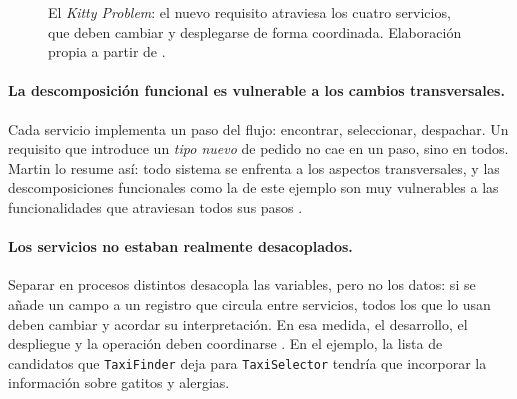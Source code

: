 \begin{figure}[htbp]
  \centering
  \caption{El \emph{Kitty Problem}: el nuevo requisito atraviesa los cuatro servicios, que
           deben cambiar y desplegarse de forma coordinada. Elaboración propia a partir de
           \textcite[242--243]{martin2017}.}
  \label{fig:p5-problema}
\end{figure}

\paragraph{La descomposición funcional es vulnerable a los cambios transversales.}
Cada servicio implementa un paso del flujo: encontrar, seleccionar, despachar. Un
requisito que introduce un \emph{tipo nuevo} de pedido no cae en un paso, sino en todos.
Martin lo resume así: todo sistema se enfrenta a los aspectos transversales, y las
descomposiciones funcionales como la de este ejemplo son muy vulnerables a las
funcionalidades que atraviesan todos sus pasos \parencite[243]{martin2017}.

\paragraph{Los servicios no estaban realmente desacoplados.}
Separar en procesos distintos desacopla las variables, pero no los datos: si se añade un
campo a un registro que circula entre servicios, todos los que lo usan deben cambiar y
acordar su interpretación. En esa medida, el desarrollo, el despliegue y la operación
deben coordinarse \parencite[240--241]{martin2017}. En el ejemplo, la lista de candidatos
que \texttt{TaxiFinder} deja para \texttt{TaxiSelector} tendría que incorporar la
información sobre gatitos y alergias.

